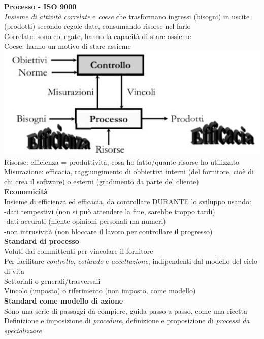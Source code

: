 \documentclass{article}
\begin{document}
		\textbf{Processo - ISO 9000}\\
		\textit{Insieme di attività correlate} e \textit{coese} che trasformano ingressi (bisogni) in uscite (prodotti) secondo regole date, consumando risorse nel farlo\\
		Correlate: sono collegate, hanno la capacità di stare assieme\\
		Coese: hanno un motivo di stare assieme\\
		\includegraphics[width=14cm]{processi.jpg}\\
		Risorse: efficienza = produttività, cosa ho fatto/quante risorse ho utilizzato\\
		Misurazione: efficacia, raggiungimento di obbiettivi interni (del fornitore, cioè di chi crea il software) o esterni (gradimento da parte del cliente)\\
		
		\textbf{Economicità}\\
		Insieme di efficienza ed efficacia, da controllare DURANTE lo sviluppo usando:\\
		-dati tempestivi (non si può attendere la fine, sarebbe troppo tardi)\\
		-dati accurati (niente opinioni personali ma numeri)\\
		-non intrusività (non bloccare il lavoro per controllare il progresso)\\

		\textbf{Standard di processo}\\
		Voluti dai committenti per vincolare il fornitore\\
		Per facilitare \textit{controllo}, \textit{collaudo} e \textit{accettazione}, indipendenti dal modello del ciclo di vita\\
		Settoriali o generali/trasversali\\
		Vincolo (imposto) o riferimento (non imposto, come modello)\\
		
		\textbf{Standard come modello di azione}\\
		Sono una serie di passaggi da compiere, guida passo a passo, come una ricetta\\
		Definizione e imposizione di \textit{procedure}, definizione e proposizione di \textit{processi da specializzare}\\
		
\end{document}
